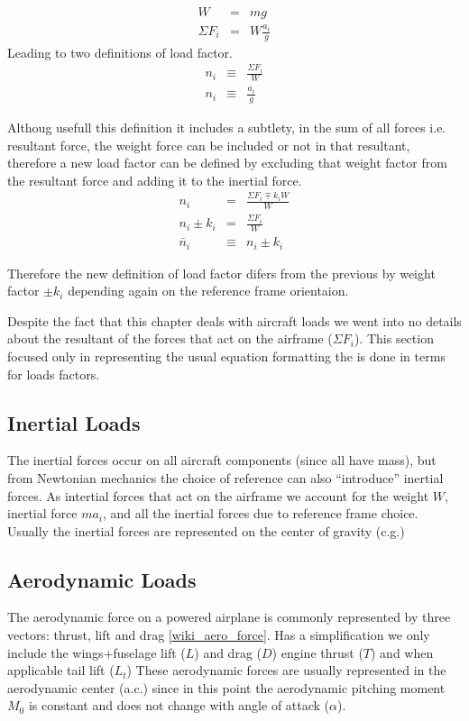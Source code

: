 \begin{eqnarray}
W &=& m g \\
\Sigma F_i &=& W \frac{a_i}{g}
\end{eqnarray}
Leading to two definitions of load factor.
\begin{eqnarray}
n_i &\equiv& \frac{\Sigma F_i}{W} \\
n_i &\equiv& \frac{a_i}{g}
\end{eqnarray}

Althoug usefull this definition it includes a subtlety, in the sum of all forces i.e. resultant force, the weight force can be included
or not in that resultant, therefore a new load factor can be defined by excluding that weight factor from the resultant force and adding it to the inertial force.
\begin{eqnarray}
n_i &=& \frac{\Sigma F_i \mp k_iW}{W} \\
n_i \pm k_i &=& \frac{\Sigma F_i}{W} \\
\bar{n}_i &\equiv& n_i \pm k_i
\end{eqnarray}

Therefore the new definition of load factor difers from the previous by weight factor $\pm k_i$ depending again on the reference frame orientaion.

Despite the fact that this chapter deals with aircraft loads we went into no details about the resultant of the forces that act on the
airframe ($\Sigma F_i$). This section focused only in representing the usual equation formatting the is done in terms for loads factors.

\subsection{Inertial Loads}
The inertial forces occur on all aircraft components (since all have mass), but from Newtonian mechanics the choice of reference can also
``introduce'' inertial forces. As intertial forces that act on the airframe we account for the weight $W$, inertial force $m a_i$, and all the
inertial forces due to reference frame choice. Usually the inertial forces are represented on the center of gravity (c.g.)



\subsection{Aerodynamic Loads}
The aerodynamic force on a powered airplane is commonly represented by three vectors: thrust, lift and drag \ref{wiki_aero_force}.
Has a simplification we only include the wings+fuselage lift ($L$) and drag ($D$) engine thrust ($T$) and when applicable tail lift ($L_t$)
These aerodynamic forces are usually represented in the aerodynamic center (a.c.) since in this point the aerodynamic pitching moment $M_0$ is constant
and does not change with angle of attack ($\alpha$).



